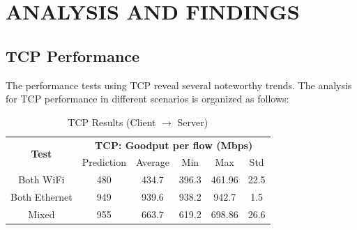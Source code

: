 
\section{ANALYSIS AND FINDINGS} \label{sec:analysis-and-findings}

    \subsection{TCP Performance} \label{subsec:tcp-performance}

        The performance tests using TCP reveal several noteworthy trends. The analysis for TCP performance in different scenarios is organized as follows:

        \begin{table}[H]
            \small
            \centering
            \begin{tabular}{|ll|lllll|}
            \hline
            \multicolumn{2}{|c|}{\multirow{2}{*}{\textbf{Test}}} & 
                \multicolumn{5}{c|}{\textbf{TCP: Goodput per flow (Mbps)}} \\
            \cline{3-7}
            \multicolumn{2}{|c|}{} &
                \multicolumn{1}{c|}{Prediction} &
                \multicolumn{1}{c|}{Average} &
                \multicolumn{1}{c|}{Min} &
                \multicolumn{1}{c|}{Max} &
                \multicolumn{1}{c|}{Std} \\
            \hline
            \multicolumn{2}{|c|}{Both WiFi} &
                \multicolumn{1}{c|}{480} &
                \multicolumn{1}{c|}{434.7} &
                \multicolumn{1}{c|}{396.3} &
                \multicolumn{1}{c|}{461.96} &
                \multicolumn{1}{c|}{22.5} \\
            \hline
            \multicolumn{2}{|c|}{Both Ethernet} &
                \multicolumn{1}{c|}{949} &
                \multicolumn{1}{c|}{939.6} &
                \multicolumn{1}{c|}{938.2} &
                \multicolumn{1}{c|}{942.7} &
                \multicolumn{1}{c|}{1.5} \\
            \hline
            \multicolumn{2}{|c|}{Mixed} &
                \multicolumn{1}{c|}{955} &
                \multicolumn{1}{c|}{663.7} &
                \multicolumn{1}{c|}{619.2} &
                \multicolumn{1}{c|}{698.86} &
                \multicolumn{1}{c|}{26.6} \\
            \hline
            \end{tabular}
            \vspace{0.5cm}
            \caption{TCP Results (Client $\rightarrow$ Server)}
            \label{tab:tcp-results}
        \end{table}

